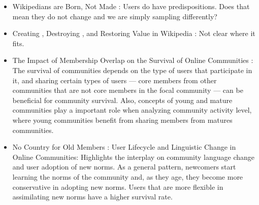 \begin{itemize}
    \item Wikipedians are Born, Not Made \cite{Panciera2009}: Users do have predispositions. Does that mean they do not change and we are simply sampling differently?

    \item Creating , Destroying , and Restoring Value in Wikipedia \cite{Priedhorsky2007}: Not clear where it fits.

    \item The Impact of Membership Overlap on the Survival of Online Communities \cite{Zhu2014}: The survival of communities depends on the type of users that participate in it, and sharing certain types of users --- core members from other communities that are not core members in the focal community --- can be beneficial for community survival. Also, concepts of young and mature communities play a important role when analyzing community activity level, where young communities benefit from sharing members from matures communities. 

    \item No Country for Old Members : User Lifecycle and Linguistic Change in Online Communities: Highlights the interplay on community language change and user adoption of new norms. As a general pattern, newcomers start learning the norms of the community and, as they age, they become more conservative in adopting new norms. Users that are more flexible in assimilating new norms have a higher survival rate.
    
\end{itemize}
